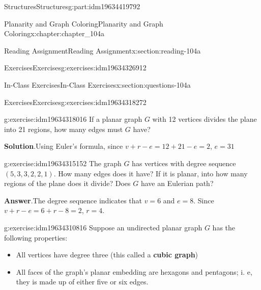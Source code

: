 \documentclass[oneside,10pt,]{book}
\newcommand{\blocktitlefont}{\relax}
\newcommand{\terminology}[1]{\textbf{#1}}
\numberwithin{equation}{section}
\begin{document}
\begin{partptx}{Structures}{}{Structures}{}{}{g:part:idm19634419792}
\begin{chapterptx}{Planarity and Graph Coloring}{}{Planarity and Graph Coloring}{}{}{x:chapter:chapter_104a}
\begin{sectionptx}{Reading Assignment}{}{Reading Assignment}{}{}{x:section:reading-104a}
\begin{exercises-subsection-numberless}{Exercises}{}{Exercises}{}{}{g:exercises:idm19634326912}
\begin{exercisegroup}
\end{exercisegroup}
\par\medskip\noindent
\end{exercises-subsection-numberless}
\end{sectionptx}
%
%
\typeout{************************************************}
\typeout{************************************************}
%
\begin{sectionptx}{In-Class Exercises}{}{In-Class Exercises}{}{}{x:section:questions-104a}
%
%
%
\typeout{************************************************}
\typeout{************************************************}
%
\begin{exercises-subsection-numberless}{Exercises}{}{Exercises}{}{}{g:exercises:idm19634318272}
\par\medskip\noindent%
%
\begin{exercisegroup}
\begin{divisionexerciseeg}{1}{}{}{g:exercise:idm19634318016}%
If a planar graph \(G\) with 12 vertices divides the plane into 21 regions, how many edges must \(G\) have?%
\par\smallskip%
\noindent\textbf{\blocktitlefont Solution}.\hypertarget{g:solution:idm19634317888}{}\quad{}Using Euler's formula, since \(v+r-e=12+21-e=2\), \(e=31\)%
\end{divisionexerciseeg}%
\begin{divisionexerciseeg}{2}{}{}{g:exercise:idm19634315152}%
%
The graph \(G\) has vertices with degree sequence \((5, 3, 3, 2, 2, 1)\). How many edges does it have? If it is planar, into how many regions of the plane does it divide?  Does \(G\) have an Eulerian path?%
\par\smallskip%
\noindent\textbf{\blocktitlefont Answer}.\hypertarget{g:answer:idm19634312896}{}\quad{}The degree sequence indicates that \(v=6\) and \(e=8\). Since \(v +r - e=6+r-8=2\), \(r = 4\).%
\end{divisionexerciseeg}%
\begin{divisionexerciseeg}{3}{}{}{g:exercise:idm19634310816}%
Suppose an undirected planar graph \(G\) has the following properties:%
\begin{itemize}[label=\textbullet]
\item{}All vertices have degree three (this called a \terminology{cubic graph})%
\item{}All faces of the graph's planar embedding are hexagons and pentagons; i. e, they is made up of either five or six edges.%

\end{itemize}
\end{divisionexerciseeg}
\end{exercisegroup}
\end{exercises-subsection-numberless}
\end{sectionptx}
\end{chapterptx}
\end{partptx}
\end{document}
